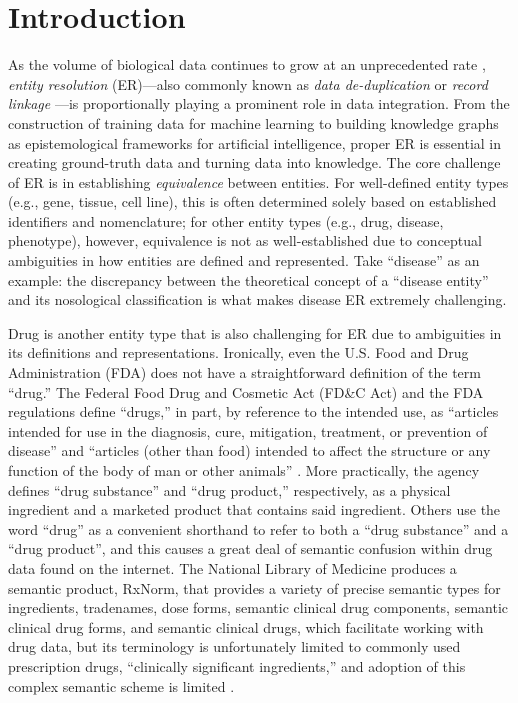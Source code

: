 \documentclass{bmcart}
\begin{document}
\section*{Introduction}
As the volume of biological data continues to grow at an unprecedented
rate \cite{Searls2005}, \emph{entity
resolution} (ER)---also commonly known as \emph{data de-duplication} or
\emph{record linkage} \cite{Fellegi1969}---is proportionally playing a prominent role in data
integration. From the construction of training data for machine
learning to building knowledge graphs as 
epistemological frameworks for artificial intelligence, proper ER 
is essential in creating ground-truth data and turning
data into knowledge. The core challenge of ER is in establishing
\emph{equivalence} between entities. For
well-defined entity types (e.g., gene, tissue, cell line), this
is often determined solely based on established identifiers and
nomenclature; for other entity types (e.g., drug, disease, phenotype),
however, equivalence is not as well-established due to conceptual
ambiguities in how entities are defined and represented. Take ``disease''
as an example: the discrepancy between the 
theoretical concept of a ``disease entity'' and its nosological classification 
\cite{Hucklenbroich2014} is what makes disease ER extremely
challenging.

Drug is another entity type that is also challenging for ER due to
ambiguities in its definitions and representations. Ironically, even the 
U.S. Food and Drug Administration (FDA) does not have a
straightforward definition of the term ``drug.'' The Federal Food Drug
and Cosmetic Act (FD\&C Act) and the FDA regulations define ``drugs,''
in part, by reference to the intended use, as ``articles intended for
use in the diagnosis, cure, mitigation, treatment, or prevention of
disease'' and ``articles (other than food) intended to affect the
structure or any function of the body of man or other
animals'' \cite{FDADrug}. More practically, the agency defines ``drug
substance'' and ``drug product,'' respectively, as a physical
ingredient and a marketed product that contains said ingredient. 
Others use the word ``drug'' as a convenient shorthand to refer 
to both a ``drug substance'' and a ``drug product'', and this causes 
a great deal of semantic confusion within drug data found on the internet. 
The National Library of Medicine produces a semantic product, RxNorm, 
that provides a variety of precise semantic types for ingredients, tradenames, dose forms,
semantic clinical drug components, semantic clinical drug forms, and
semantic clinical drugs, which facilitate working with drug data, but
its terminology is unfortunately limited to commonly used prescription 
drugs, ``clinically significant ingredients,'' and adoption of this
complex semantic scheme is limited \cite{RxNorm}. 
\end{document}
